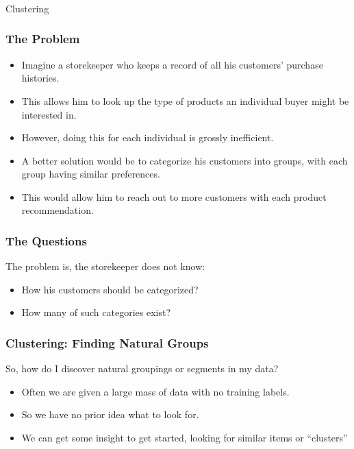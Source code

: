 \begin{frame}[fragile]\frametitle{}
\begin{center}
{\Large Clustering}
\end{center}
\end{frame}

\begin{frame}[fragile]\frametitle{The Problem}
\begin{itemize}
\item Imagine a storekeeper who keeps a record of all his customers' purchase histories. 
\item This allows him to look up the type of products an individual buyer might be interested in. 
\item However, doing this for each individual is grossly inefficient. 
\item A better solution would be to categorize his customers into groups, with each group having similar preferences. 
\item This would allow him to reach out to more customers with each product recommendation.
\end{itemize}
\end{frame}

\begin{frame}[fragile]\frametitle{The Questions}
The problem is, the storekeeper does not know:
\begin{itemize}
\item How his customers should be categorized?
\item How many of such categories exist?
\end{itemize}
\end{frame}

\begin{frame}[fragile]\frametitle{Clustering: Finding Natural Groups}
So, how do I discover natural groupings or segments in my data?
\begin{itemize}
\item Often we are given a large mass of data with no training labels. 
\item So we have no prior idea what to look for.
\item We can get some insight to get started, looking for similar items or ``clusters''
\end{itemize}
\end{frame}


